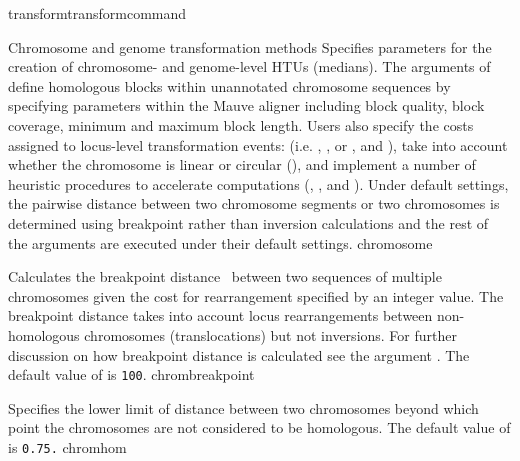\begin{command}{transform}{transformcommand}
\begin{arguments}
\begin{argumentgroup}{Chromosome and genome transformation methods}
                {Specifies parameters for the creation of  chro\-mosome- and genome-level 
                HTUs (medians). The arguments of  define 
                homologous blocks within unannotated chromosome sequences by
                specifying parameters within the Mauve aligner \cite{darlingetal2004} 
                including block quality, block coverage, minimum and maximum block
                 length. Users also specify the costs assigned to locus-level transformation 
                 events: (i.e. , , or 
                , and ), 
                take into account whether the chromosome is linear or circular 
                (), and implement a number of heuristic 
                procedures to accelerate computations (, 
                , and ).  
                Under default settings, the pairwise distance between two chromosome 
                segments or two chromosomes is determined using breakpoint rather 
                than inversion calculations and the rest of the arguments are executed 
                under their default settings.}
                {chromosome}
             
      		{Calculates the breakpoint distance~\cite{blanchetteetal1997}
                between two sequences of multiple chromosomes given the cost for
                rearrangement specified by an integer value. The breakpoint distance
                takes into account locus rearrangements between non-homologous
                chromosomes (translocations) but not inversions. For further discussion on 
                how breakpoint distance is calculated see the argument .  
                The default value of  is \texttt{100}.} 
                {chrombreakpoint}
                        
            {Specifies the lower limit of distance between two chromosomes beyond which 
            point the chromosomes are not considered to be homologous. 
            The default value of  is \texttt{0.75.}}
            {chromhom}
      

\end{argumentgroup}
\end{arguments}
\end{command}
